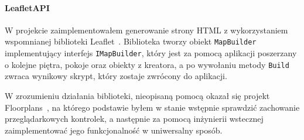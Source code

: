 \paragraph{LeafletAPI}
W projekcie zaimplementowałem generowanie strony HTML z wykorzystaniem wspomnianej biblioteki Leaflet~\cite{leafletGithub}.
Biblioteka tworzy obiekt \verb|MapBuilder| implementujący interfejs \verb|IMapBuilder|, który jest 
za pomocą aplikacji poszerzany o kolejne piętra, pokoje oraz obiekty z kreatora, a po wywołaniu 
metody \verb|Build| zwraca wynikowy skrypt, który zostaje zwrócony do aplikacji.

W zrozumieniu działania biblioteki, nieopisaną pomocą okazał się projekt Floorplans~\cite{floorplansGithub},
na którego podstawie byłem w stanie wstępnie sprawdzić zachowanie przeglądarkowych kontrolek, 
a następnie za pomocą inżynierii wstecznej zaimplementować jego funkcjonalność w uniwersalny sposób.


